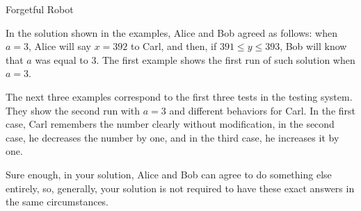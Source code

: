 \begin{problem}{Forgetful Robot}
\Explanations

In the solution shown in the examples, Alice and Bob agreed as follows:
when $a = 3$, Alice will say $x = 392$ to Carl,
and then, if $391 \le y \le 393$, Bob will know that $a$ was equal to $3$.
The first example shows the first run of such solution when $a = 3$.

The next three examples correspond to the first three tests
in the testing system.
They show the second run with $a = 3$ and different behaviors for Carl.
In the first case, Carl remembers the number clearly without modification,
in the second case, he decreases the number by one,
and in the third case, he increases it by one.

Sure enough, in your solution, Alice and Bob can agree
to do something else entirely, so, generally,
your solution is not required to have these exact answers
in the same circumstances.

\end{problem}
